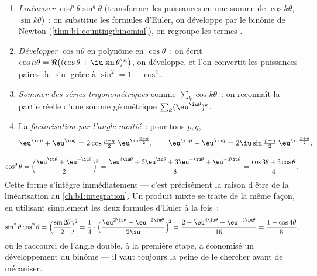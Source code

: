 \begin{method}\label{met:b1:complex:trig}
\begin{enumerate}
  \item \emph{Linéariser} $\cos^p\theta \sin^q\theta$ (transformer les
        puissances en une somme de $\cos k\theta$, $\sin k\theta$)~:
        on substitue les formules d'Euler, on développe par le binôme
        de Newton (\cref{thm:b1:counting:binomial}), on regroupe les
        termes .
  \item \emph{Développer} $\cos n\theta$ en polynôme en $\cos\theta$~:
        on écrit $\cos n\theta = \Re\bigl((\cos\theta +
        \iu\sin\theta)^n\bigr)$, on développe, et l'on convertit les
        puissances paires de $\sin$ grâce à $\sin^2 = 1 - \cos^2$.
  \item \emph{Sommer des séries trigonométriques} comme $\sum_k \cos
        k\theta$~: on reconnaît la partie réelle d'une somme
        géométrique $\sum_k (\eu^{\iu\theta})^k$.
  \item La \emph{factorisation par l'angle moitié}~: pour tous $p, q$,
        \[
        \eu^{\iu p} + \eu^{\iu q}
        = 2 \cos\tfrac{p - q}{2}\; \eu^{\iu \frac{p+q}{2}},
        \qquad
        \eu^{\iu p} - \eu^{\iu q}
        = 2\iu \sin\tfrac{p - q}{2}\; \eu^{\iu \frac{p+q}{2}} .
        \]
\end{enumerate}
\end{method}

\begin{example}[Linéarisation]\label{ex:b1:complex:linearize}
\[
\cos^3\theta
= \Bigl(\frac{\eu^{\iu\theta} + \eu^{-\iu\theta}}{2}\Bigr)^{\!3}
= \frac{\eu^{3\iu\theta} + 3\eu^{\iu\theta} + 3\eu^{-\iu\theta} +
\eu^{-3\iu\theta}}{8}
= \frac{\cos 3\theta + 3\cos\theta}{4}.
\]
Cette forme s'intègre immédiatement --- c'est précisément la
raison d'être de la linéarisation au \cref{ch:b1:integration}. Un
produit mixte se traite de la même façon, en utilisant simplement
les deux formules d'Euler à la fois~:
\[
\sin^2\theta\cos^2\theta
= \Bigl(\frac{\sin2\theta}2\Bigr)^{\!2}
= \frac{1}{4}\cdot
\Bigl(\frac{\eu^{2\iu\theta} - \eu^{-2\iu\theta}}{2\iu}
\Bigr)^{\!2}
= \frac{2 - \eu^{4\iu\theta} - \eu^{-4\iu\theta}}{16}
= \frac{1 - \cos4\theta}{8} ,
\]
où le raccourci de l'angle double, à la première étape, a économisé
un développement du binôme --- il vaut toujours la peine de le
chercher avant de mécaniser.
\end{example}

